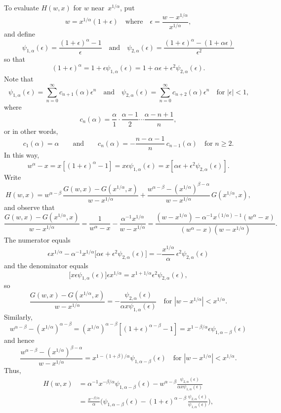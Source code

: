 \documentclass[12pt,a4paper]{article}
\begin{document}
To evaluate $H(w,x)$ for $w$ near~$x^{1/\alpha}$, put
\[
w=x^{1/\alpha}(1+\epsilon)\quad\text{where}\quad 
\epsilon=\frac{w-x^{1/\alpha}}{x^{1/\alpha}},
\]
and define
\begin{equation}\label{eq: psi 1 2}
\psi_{1,\alpha}(\epsilon)=\frac{(1+\epsilon)^\alpha-1}{\epsilon}
\quad\text{and}\quad
\psi_{2,\alpha}(\epsilon)
=\frac{(1+\epsilon)^\alpha-(1+\alpha\epsilon)}{\epsilon^2}
\end{equation}
so that
\[
(1+\epsilon)^\alpha=1+\epsilon\psi_{1,\alpha}(\epsilon)=1+\alpha\epsilon
    +\epsilon^2\psi_{2,\alpha}(\epsilon).
\]
Note that
\[
\psi_{1,\alpha}(\epsilon)=\sum_{n=0}^\infty c_{n+1}(\alpha)\epsilon^n
\quad\text{and}\quad
\psi_{2,\alpha}(\epsilon)=\sum_{n=0}^\infty c_{n+2}(\alpha)\epsilon^n
\quad\text{for $|\epsilon|<1$,}
\]
where
\[
c_n(\alpha)=\frac{\alpha}{1}\cdot\frac{\alpha-1}{2}\cdots\frac{\alpha-n+1}{n},
\]
or in other words,
\[
c_1(\alpha)=\alpha\qquad\text{and}\qquad 
c_n(\alpha)=-\frac{n-\alpha-1}{n}\,c_{n-1}(\alpha)
\quad\text{for $n\ge2$.}
\]
In this way,
\[
w^\alpha-x=x[(1+\epsilon)^\alpha-1]=x\epsilon\psi_{1,\alpha}(\epsilon)
    =x[\alpha\epsilon+\epsilon^2\psi_{2,\alpha}(\epsilon)].
\]
Write
\[
H(w,x)=w^{\alpha-\beta}\,\frac{G(w,x)-G(x^{1/\alpha},x)}{w-x^{1/\alpha}}
+\frac{w^{\alpha-\beta}-(x^{1/\alpha})^{\beta-\alpha}}{w-x^{1/\alpha}}
    \,G(x^{1/\alpha},x),
\]
and observe that
\[
\frac{G(w,x)-G(x^{1/\alpha},x)}{w-x^{1/\alpha}}
=\frac{1}{w^\alpha-x}-\frac{\alpha^{-1}x^{1/\alpha}}{w-x^{1/\alpha}}
=\frac{(w-x^{1/\alpha})-\alpha^{-1}x^{(1/\alpha)-1} (w^\alpha-x)}%
{(w^\alpha-x)(w-x^{1/\alpha})}.
\]
The numerator equals
\[
\epsilon x^{1/\alpha}-\alpha^{-1}x^{1/\alpha}\bigl[\alpha\epsilon
    +\epsilon^2\psi_{2,\alpha}(\epsilon)\bigr]
    =-\frac{x^{1/\alpha}}{\alpha}\,\epsilon^2\psi_{2,\alpha}(\epsilon)
\]
and the denominator equals
\[
\bigl[x\epsilon\psi_{1,\alpha}(\epsilon)\bigr]\epsilon x^{1/\alpha}
    =x^{1+1/\alpha}\epsilon^2\psi_{2,\alpha}(\epsilon),
\]
so
\[
\frac{G(w,x)-G(x^{1/\alpha},x)}{w-x^{1/\alpha}}
    =-\frac{\psi_{2,\alpha}(\epsilon)}{\alpha x\psi_{1,\alpha}(\epsilon)}
    \quad\text{for $|w-x^{1/\alpha}|<x^{1/\alpha}$.}
\]
Similarly,
\[
w^{\alpha-\beta}-(x^{1/\alpha})^{\alpha-\beta}
    =(x^{1/\alpha})^{\alpha-\beta}[(1+\epsilon)^{\alpha-\beta}-1]
    =x^{1-\beta/\alpha}\epsilon\psi_{1,\alpha-\beta}(\epsilon)
\]
and hence
\[
\frac{w^{\alpha-\beta}-(x^{1/\alpha})^{\beta-\alpha}}{w-x^{1/\alpha}}
    =x^{1-(1+\beta)/\alpha}\psi_{1,\alpha-\beta}(\epsilon)
    \quad\text{for $|w-x^{1/\alpha}|<x^{1/\alpha}$.}
\]
Thus,
\begin{align*}
H(w,x)&=\alpha^{-1}x^{-\beta/\alpha}\psi_{1,\alpha-\beta}(\epsilon)
-w^{\alpha-\beta}\frac{\psi_{2,\alpha}(\epsilon)}%
{\alpha x\psi_{1,\alpha}(\epsilon)}\\
    &=\frac{x^{-\beta/\alpha}}{\alpha}\biggl(\psi_{1,\alpha-\beta}(\epsilon)
    -(1+\epsilon)^{\alpha-\beta}\,\frac{\psi_{2,\alpha}(\epsilon)}%
{\psi_{1,\alpha}(\epsilon)}\biggr),
\end{align*}
\end{document}
